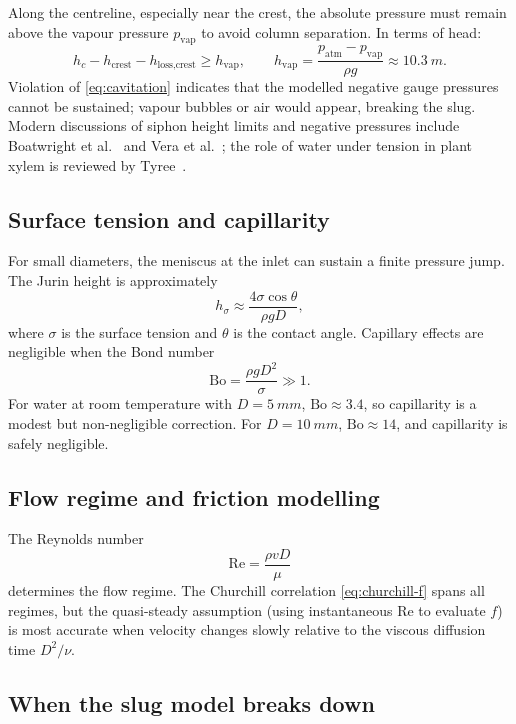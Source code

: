 \documentclass[11pt]{article}
\theoremstyle{definition}
\begin{document}
Along the centreline, especially near the crest, the absolute pressure must remain above 
the vapour pressure $p_{\text{vap}}$ to avoid column separation. In terms of head:
\begin{equation}
  h_c - h_{\text{crest}} - h_{\text{loss,crest}} \ge h_{\text{vap}}, \qquad
  h_{\text{vap}} = \frac{p_{\text{atm}} - p_{\text{vap}}}{\rho g} \approx \SI{10.3}{m}.
  \label{eq:cavitation}
\end{equation}
Violation of \eqref{eq:cavitation} indicates that the modelled negative gauge pressures 
cannot be sustained; vapour bubbles or air would appear, breaking the slug. Modern 
discussions of siphon height limits and negative pressures include 
Boatwright et al.~\cite{boatwright} and Vera et al.~\cite{vera}; the role of water under 
tension in plant xylem is reviewed by Tyree~\cite{tyree}.

\subsection{Surface tension and capillarity}

For small diameters, the meniscus at the inlet can sustain a finite pressure jump. The 
Jurin height is approximately
\[
  h_\sigma \approx \frac{4\sigma \cos\theta}{\rho g D},
\]
where $\sigma$ is the surface tension and $\theta$ is the contact angle. Capillary effects 
are negligible when the Bond number
\[
  \text{Bo} = \frac{\rho g D^2}{\sigma} \gg 1.
\]
For water at room temperature with $D = \SI{5}{mm}$, $\text{Bo} \approx 3.4$, so capillarity 
is a modest but non-negligible correction. For $D = \SI{10}{mm}$, $\text{Bo} \approx 14$, 
and capillarity is safely negligible.

\subsection{Flow regime and friction modelling}

The Reynolds number
\[
  \text{Re} = \frac{\rho v D}{\mu}
\]
determines the flow regime. The Churchill correlation \eqref{eq:churchill-f} spans all 
regimes, but the quasi-steady assumption (using instantaneous $\text{Re}$ to evaluate $f$) 
is most accurate when velocity changes slowly relative to the viscous diffusion time 
$D^2/\nu$.

\subsection{When the slug model breaks down}
\end{document}
